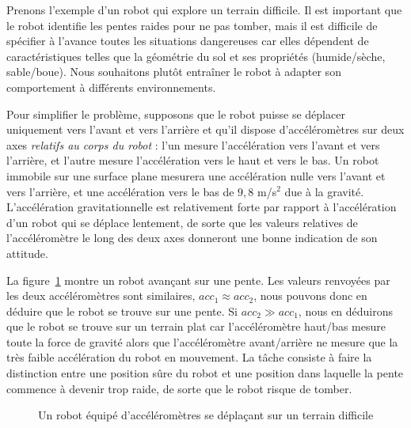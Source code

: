 Prenons l'exemple d'un robot qui explore un terrain difficile. Il est important que le robot identifie les pentes raides pour ne pas tomber, mais il est difficile de spécifier à l'avance toutes les situations dangereuses car elles dépendent de caractéristiques telles que la géométrie du sol et ses propriétés (humide/sèche, sable/boue). Nous souhaitons plutôt entraîner le robot à adapter son comportement à différents environnements.

Pour simplifier le problème, supposons que le robot puisse se déplacer uniquement vers l'avant et vers l'arrière et qu'il dispose d'accéléromètres sur deux axes \emph{relatifs au corps du robot} : l'un mesure l'accélération vers l'avant et vers l'arrière, et l'autre mesure l'accélération vers le haut et vers le bas. Un robot immobile sur une surface plane mesurera une accélération nulle vers l'avant et vers l'arrière, et une accélération vers le bas de $9,8$ m/s$^{2}$ due à la gravité. L'accélération gravitationnelle est relativement forte par rapport à l'accélération d'un robot qui se déplace lentement, de sorte que les valeurs relatives de l'accéléromètre le long des deux axes donneront une bonne indication de son attitude.

La figure~\ref{fig.slopes} montre un robot avançant sur une pente. Les valeurs renvoyées par les deux accéléromètres sont similaires, $\mathit{acc}_1\approx \mathit{acc}_2$, nous pouvons donc en déduire que le robot se trouve sur une pente. Si $\mathit{acc}_2\gg\mathit{acc}_1$, nous en déduirons que le robot se trouve sur un terrain plat car l'accéléromètre haut/bas mesure toute la force de gravité alors que l'accéléromètre avant/arrière ne mesure que la très faible accélération du robot en mouvement. La tâche consiste à faire la distinction entre une position sûre du robot et une position dans laquelle la pente commence à devenir trop raide, de sorte que le robot risque de tomber.

\begin{figure}
\begin{center}
\end{center}
\caption{Un robot équipé d'accéléromètres se déplaçant sur un terrain difficile}\label{fig.slopes}
\end{figure}

